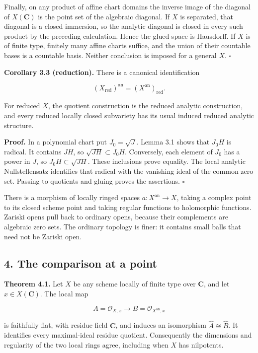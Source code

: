 \documentclass[11pt]{article}
\begin{document}
Finally, on any product of affine chart domains the inverse image of the
diagonal of \(X(\mathbf C)\) is the point set of the algebraic diagonal.
If \(X\) is separated, that diagonal is a closed immersion, so the
analytic diagonal is closed in every such product by the preceding
calculation. Hence the glued space is Hausdorff. If \(X\) is of finite
type, finitely many affine charts suffice, and the union of their
countable bases is a countable basis. Neither conclusion is imposed for
a general \(X\). \(\square\)

\textbf{Corollary 3.3 (reduction).} There is a canonical identification

\[
(X_{\mathrm{red}})^{\mathrm{an}}=(X^{\mathrm{an}})_{\mathrm{red}}.
\]

For reduced \(X\), the quotient construction is the reduced analytic
construction, and every reduced locally closed subvariety has its usual
induced reduced analytic structure.

\textbf{Proof.} In a polynomial chart put \(J_0=\sqrt J\). Lemma 3.1
shows that \(J_0H\) is radical. It contains \(JH\), so
\(\sqrt{JH}\subset J_0H\). Conversely, each element of \(J_0\) has a
power in \(J\), so \(J_0H\subset\sqrt{JH}\). These inclusions prove
equality. The local analytic Nullstellensatz identifies that radical
with the vanishing ideal of the common zero set. Passing to quotients
and gluing proves the assertions. \(\square\)

There is a morphism of locally ringed spaces \(a:X^{\mathrm{an}}\to X\),
taking a complex point to its closed scheme point and taking regular
functions to holomorphic functions. Zariski opens pull back to ordinary
opens, because their complements are algebraic zero sets. The ordinary
topology is finer: it contains small balls that need not be Zariski
open.

\subsection{4. The comparison at a
point}\label{the-comparison-at-a-point}

\textbf{Theorem 4.1.} Let \(X\) be any scheme locally of finite type
over \(\mathbf C\), and let \(x\in X(\mathbf C)\). The local map

\[
A=\mathcal O_{X,x}\longrightarrow B=\mathcal O_{X^{\mathrm{an}},x}
\]

is faithfully flat, with residue field \(\mathbf C\), and induces an
isomorphism \(\widehat A\cong\widehat B\). It identifies every
maximal-ideal residue quotient. Consequently the dimensions and
regularity of the two local rings agree, including when \(X\) has
nilpotents.
\end{document}
